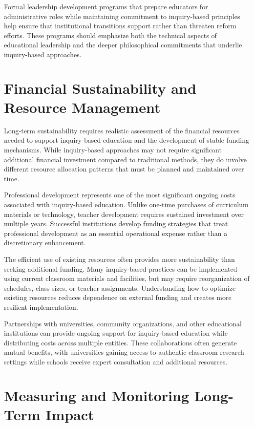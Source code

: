 \documentclass[
  Letterpaper,
]{scrbook}
\begin{document}
Formal leadership development programs that prepare educators for
administrative roles while maintaining commitment to inquiry-based
principles help ensure that institutional transitions support rather
than threaten reform efforts. These programs should emphasize both the
technical aspects of educational leadership and the deeper philosophical
commitments that underlie inquiry-based approaches.

\section{Financial Sustainability and Resource
Management}\label{financial-sustainability-and-resource-management}

Long-term sustainability requires realistic assessment of the financial
resources needed to support inquiry-based education and the development
of stable funding mechanisms. While inquiry-based approaches may not
require significant additional financial investment compared to
traditional methods, they do involve different resource allocation
patterns that must be planned and maintained over time.

Professional development represents one of the most significant ongoing
costs associated with inquiry-based education. Unlike one-time purchases
of curriculum materials or technology, teacher development requires
sustained investment over multiple years. Successful institutions
develop funding strategies that treat professional development as an
essential operational expense rather than a discretionary enhancement.

The efficient use of existing resources often provides more
sustainability than seeking additional funding. Many inquiry-based
practices can be implemented using current classroom materials and
facilities, but may require reorganization of schedules, class sizes, or
teacher assignments. Understanding how to optimize existing resources
reduces dependence on external funding and creates more resilient
implementation.

Partnerships with universities, community organizations, and other
educational institutions can provide ongoing support for inquiry-based
education while distributing costs across multiple entities. These
collaborations often generate mutual benefits, with universities gaining
access to authentic classroom research settings while schools receive
expert consultation and additional resources.

\section{Measuring and Monitoring Long-Term
Impact}\label{measuring-and-monitoring-long-term-impact}
\end{document}
